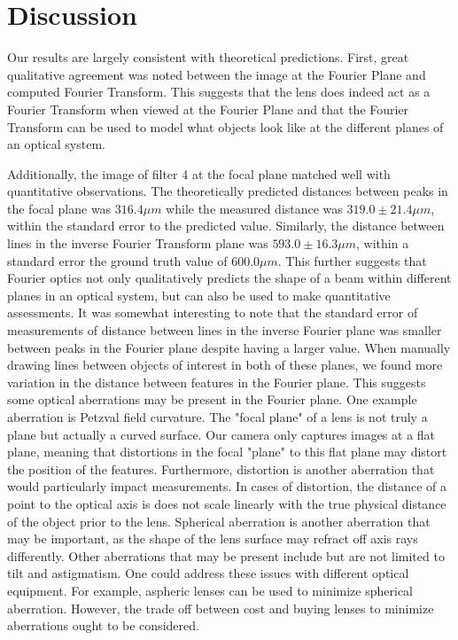 \documentclass[twocolumn,amsmath,amssymb,pra]{revtex4-2}
\begin{document}
\section{Discussion}
Our results are largely consistent with theoretical predictions. First, great qualitative agreement was noted between the image at the Fourier Plane and computed Fourier Transform. This suggests that the lens does indeed act as a Fourier Transform when viewed at the Fourier Plane and that the Fourier Transform can be used to model what objects look like at the different planes of an optical system.

Additionally, the image of filter 4 at the focal plane matched well with quantitative observations. The theoretically predicted distances between peaks in the focal plane was $316.4 \mu m$ while the measured distance was $319.0 \pm 21.4 \mu m$, within the standard error to the predicted value. Similarly, the distance between lines in the inverse Fourier Transform plane was  $593.0 \pm 16.3 \mu m$, within a standard error the ground truth value of $600.0 \mu m$. This further suggests that Fourier optics not only qualitatively predicts the shape of a beam within different planes in an optical system, but can also be used to make quantitative assessments. It was somewhat interesting to note that the standard error of measurements of distance between lines in the inverse Fourier plane was smaller between peaks in the Fourier plane despite having a larger value. When manually drawing lines between objects of interest in both of these planes, we found more variation in the distance between features in the Fourier plane. This suggests some optical aberrations may be present in the Fourier plane. One example aberration is Petzval field curvature. The "focal plane" of a lens is not truly a plane but actually a curved surface. Our camera only captures images at a flat plane, meaning that distortions in the focal "plane" to this flat plane may distort the position of the features. Furthermore, distortion is another aberration that would particularly impact measurements. In cases of distortion, the distance of a point to the optical axis is does not scale linearly with the true physical distance of the object prior to the lens. Spherical aberration is another aberration that may be important, as the shape of the lens surface may refract off axis rays differently. Other aberrations that may be present include but are not limited to tilt and astigmatism. One could address these issues with different optical equipment. For example, aspheric lenses can be used to minimize spherical aberration. However, the trade off between cost and buying lenses to minimize aberrations ought to be considered. 
\end{document}
